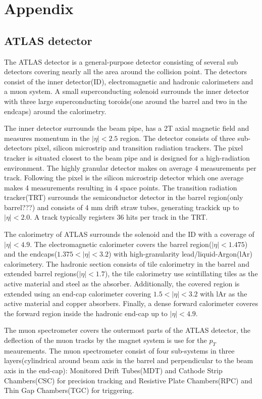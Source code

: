 \section*{Appendix}

\subsection{ATLAS detector}

The ATLAS detector\cite{ATLASMachine} is a general-purpose detector consisting of several sub detectors covering nearly all the area around the collision point. The detectors consist of the inner detector(ID), electromagnetic and hadronic calorimeters and a muon system. A small superconducting solenoid surrounds the inner detector with three large superconducting toroids(one around the barrel and two in the endcaps) around the calorimetry.

The inner detector surrounds the beam pipe, has a 2T axial magnetic field and measures momentum in the $|\eta| < 2.5$ region. The detector consists of three sub-detectors pixel, silicon microstrip and transition radiation trackers. The pixel tracker is situated closest to the beam pipe and is designed for a high-radiation environment. The highly granular detector makes on average 4 measurements per track. Following the pixel is the silicon microstrip detector which one average makes 4 measurements resulting in 4 space points. %
The transition radiation tracker(TRT) surrounds the semiconductor detector in the barrel region(only barrel???) and consists of 4 mm drift straw tubes, generating trackick up to $|\eta| < 2.0 $. A track typically registers 36 hits per track in the TRT.

The calorimetry of ATLAS surrounds the solenoid and the ID with a coverage of $|\eta| < 4.9$. The electromagnetic calorimeter covers the barrel region($|\eta| < 1.475$) and the endcaps($1.375 < |\eta| < 3.2 $) with high-granularity lead/liquid-Argon(lAr) calorimetery. The hadronic section consists of tile calorimetry in the barrel and extended barrel regions($|\eta| < 1.7 $), the tile calorimetry use scintillating tiles as the active material and steel as the absorber. Additionally, the covered region is extended using an end-cap calorimeter covering $1.5 < |\eta| < 3.2 $ with lAr as the active material and copper absorbers. Finally, a dense forward calorimeter coveres the forward region inside the hadronic end-cap up to $|\eta| < 4.9 $.

The muon spectrometer covers the outermost parts of the ATLAS detector, the deflection of the muon tracks by the magnet system is use for the $p_T$ meaurements. The muon spectrometer consist of four sub-systems in three layers(cylindrical around beam axis in the barrel and perpendicular to the beam axis in the end-cap): Monitored Drift Tubes(MDT) and Cathode Strip Chambers(CSC) for precision tracking and Resistive Plate Chambers(RPC) and Thin Gap Chambers(TGC) for triggering.